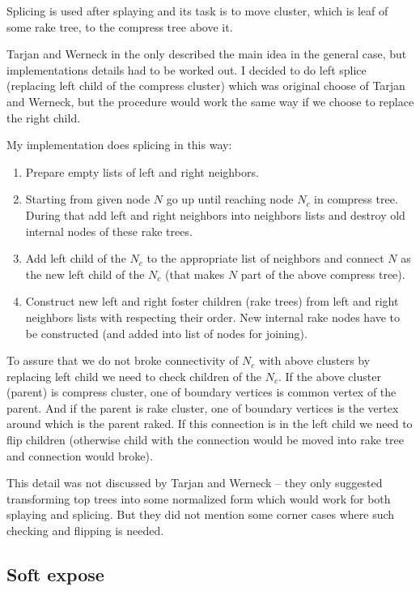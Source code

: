 
Splicing is used after splaying and its task is to move cluster, which is leaf
of some rake tree, to the compress tree above it.

Tarjan and Werneck in the \cite{SelfAdjustingTT} only described the main idea in
the general case, but implementations details had to be worked out. I decided
to do {\I left splice} (replacing left child of the compress cluster) which was
original choose of Tarjan and Werneck, but the procedure would work the same
way if we choose to replace the right child.

My implementation does splicing in this way:
\begin{enumerate}
\item Prepare empty lists of left and right neighbors.
\item Starting from given node $N$ go up until reaching node $N_c$ in compress
tree. During that add left and right neighbors into neighbors lists and destroy
old internal nodes of these rake trees.
\item Add left child of the $N_c$ to the appropriate list of neighbors and
connect $N$ as the new left child of the $N_c$ (that makes $N$ part of the above
compress tree).
\item Construct new left and right foster children (rake trees) from left and
right neighbors lists with respecting their order. New internal rake nodes have
to be constructed (and added into list of nodes for joining).
\end{enumerate}

To assure that we do not broke connectivity of $N_c$ with above clusters by
replacing left child we need to check children of the $N_c$. If the above
cluster (parent) is compress cluster, one of boundary vertices is common vertex
of the parent. And if the parent is rake cluster, one of boundary vertices is
the vertex around which is the parent raked. If this connection is in the left
child we need to flip children (otherwise child with the connection would be
moved into rake tree and connection would broke).

This detail was not discussed by Tarjan and Werneck -- they only suggested
transforming top trees into some normalized form which would work for both
splaying and splicing. But they did not mention some corner cases where such
checking and flipping is needed.

\subsection{Soft expose}

